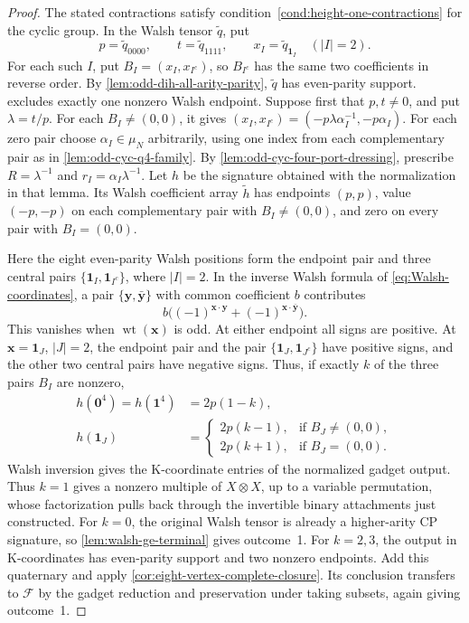 \documentclass[11pt,letterpaper,onecolumn]{article}
\theoremstyle{plain}
\theoremstyle{definition}
\theoremstyle{remark}
\newcommand{\cF}{\mathcal F}
\newcommand{\wt}{\operatorname{wt}}
\newcommand{\one}{\mathbf 1}
\newcommand{\zero}{\mathbf 0}
\begin{document}
	\begin{proof}
		The stated contractions satisfy
		condition~\ref{cond:height-one-contractions} for the cyclic group.
		In the Walsh tensor \(\widetilde q\), put
		\[
		p=\widetilde q_{0000},\qquad
		t=\widetilde q_{1111},\qquad
		x_I=\widetilde q_{\one_I}\quad(|I|=2).
		\]
		For each such \(I\), put \(B_I=(x_I,x_{I^c})\), so
		\(B_{I^c}\) has the same two coefficients in reverse order.
		By \cref{lem:odd-dih-all-arity-parity}, \(\widetilde q\) has even-parity support.  excludes exactly one nonzero
		Walsh endpoint.  Suppose first that \(p,t\ne0\), and put \(\lambda=t/p\).
		For each \(B_I\ne(0,0)\), it gives
		\((x_I,x_{I^c})=(-p\lambda\alpha_I^{-1},-p\alpha_I)\).
		For each zero pair choose \(\alpha_I\in\mu_N\) arbitrarily, using one
		index from each complementary pair as in \cref{lem:odd-cyc-q4-family}.
		By \cref{lem:odd-cyc-four-port-dressing}, prescribe
		\(R=\lambda^{-1}\) and \(r_I=\alpha_I\lambda^{-1}\).  Let \(h\) be the
		signature obtained with the normalization in that lemma.  Its Walsh coefficient array
		\(\widetilde h\) has endpoints
		\((p,p)\), value \((-p,-p)\) on each complementary pair with \(B_I\ne(0,0)\),
		and zero on every pair with \(B_I=(0,0)\).
		
		Here the eight even-parity Walsh positions form the endpoint pair and
		three central pairs \(\{\one_I,\one_{I^c}\}\), where \(|I|=2\).
		In the inverse Walsh formula of \cref{eq:Walsh-coordinates}, a pair
		\(\{{\mathbf y},\bar {\mathbf y}\}\) with common coefficient \(b\) contributes
		\[
		b\bigl((-1)^{{\mathbf x}\cdot {\mathbf y}}+(-1)^{{\mathbf x}\cdot\bar {\mathbf y}}\bigr).
		\]
		This vanishes when \(\wt({\mathbf x})\) is odd.  At either endpoint all signs are
		positive.  At \({\mathbf x}=\one_J\), \(|J|=2\), the endpoint pair and the
		pair \(\{\one_J,\one_{J^c}\}\) have positive signs, and the other two
		central pairs have negative signs.  Thus, if exactly \(k\) of the three pairs \(B_I\) are
		nonzero,
		\[
		\begin{aligned}
			h(\zero^4)=h(\one^4)&=2p(1-k),\\
			h(\one_J)&=
			\begin{cases}
				2p(k-1),&\text{if \(B_J\ne(0,0)\)},\\
				2p(k+1),&\text{if \(B_J=(0,0)\)}.
			\end{cases}
		\end{aligned}
		\]
		Walsh inversion gives the K-coordinate entries of the normalized gadget
		output. Thus \(k=1\) gives a
		nonzero multiple of \(X\otimes X\), up to a variable permutation, whose
		factorization pulls back through the invertible binary attachments just
		constructed.  For
		\(k=0\), the original Walsh tensor is already a higher-arity CP signature, so
		\cref{lem:walsh-ge-terminal} gives outcome~1.  For \(k=2,3\), the output in
		K-coordinates has even-parity support and two nonzero endpoints.  Add this quaternary and apply \cref{cor:eight-vertex-complete-closure}.  Its
		conclusion transfers to \(\cF\) by the gadget
		reduction and preservation under taking subsets, again giving outcome~1.
		

\end{proof}
\end{document}

